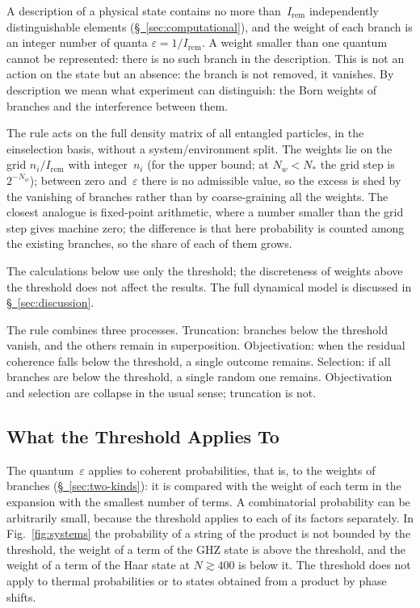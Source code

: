 \documentclass[11pt,a4paper]{article}
\newcommand{\Ost}{I_{\mathrm{rem}}}
\begin{document}
A description of a physical state contains no more than~$\Ost$ independently distinguishable elements (\hyperref[sec:computational]{\S~\ref*{sec:computational}}), and the weight of each branch is an integer number of quanta $\varepsilon=1/\Ost$. A weight smaller than one quantum cannot be represented: there is no such branch in the description. This is not an action on the state but an absence: the branch is not removed, it vanishes. By description we mean what experiment can distinguish: the Born weights of branches and the interference between them.

The rule acts on the full density matrix of all entangled particles, in the einselection basis, without a system/environment split. The weights lie on the grid $n_i/\Ost$ with integer~$n_i$ (for the upper bound; at $N_w<N_*$ the grid step is $2^{-N_w}$); between zero and~$\varepsilon$ there is no admissible value, so the excess is shed by the vanishing of branches rather than by coarse-graining all the weights. The closest analogue is fixed-point arithmetic, where a number smaller than the grid step gives machine zero; the difference is that here probability is counted among the existing branches, so the share of each of them grows.

The calculations below use only the threshold; the discreteness of weights above the threshold does not affect the results. The full dynamical model is discussed in \hyperref[sec:discussion]{\S~\ref*{sec:discussion}}.

The rule combines three processes. Truncation: branches below the threshold vanish, and the others remain in superposition. Objectivation: when the residual coherence falls below the threshold, a single outcome remains. Selection: if all branches are below the threshold, a single random one remains. Objectivation and selection are collapse in the usual sense; truncation is not.

\subsection{What the Threshold Applies To}
\label{sec:applies}

The quantum~$\varepsilon$ applies to coherent probabilities, that is, to the weights of branches (\hyperref[sec:two-kinds]{\S~\ref*{sec:two-kinds}}): it is compared with the weight of each term in the expansion with the smallest number of terms. A combinatorial probability can be arbitrarily small, because the threshold applies to each of its factors separately. In Fig.~\ref{fig:systems} the probability of a string of the product is not bounded by the threshold, the weight of a term of the GHZ state is above the threshold, and the weight of a term of the Haar state at $N\gtrsim400$ is below it. The threshold does not apply to thermal probabilities or to states obtained from a product by phase shifts.
\end{document}
